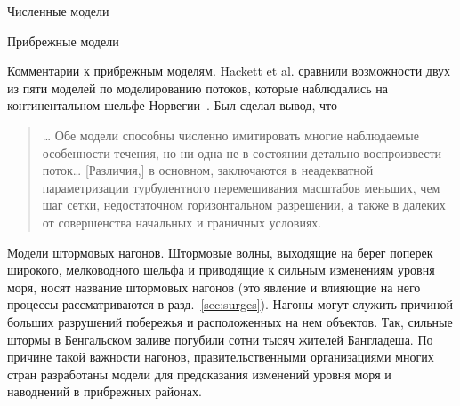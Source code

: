\begin{chapter}{Численные модели}
\begin{section}{Прибрежные модели}
\begin{paragraph}{Комментарии к прибрежным моделям.}
Hackett et al. сравнили возможности двух из пяти моделей по моделированию
потоков, которые наблюдались на континентальном шельфе Норвегии~\cite{Hackett:1995}. 
Был сделал вывод, что
%
\begin{quote}
\dots{} Обе модели способны численно имитировать многие наблюдаемые особенности 
течения, но ни одна не в состоянии детально воспроизвести поток\dots{} 
[Различия,] в основном, заключаются в неадекватной параметризации 
турбулентного перемешивания
масштабов меньших, чем шаг сетки, недостаточном горизонтальном
разрешении, а также в далеких от совершенства начальных и граничных условиях.
%
\end{quote}
\end{paragraph}

\begin{paragraph}{Модели штормовых нагонов.}
%
Штормовые волны, выходящие на берег поперек широкого,
мелководного шельфа и приводящие к сильным изменениям уровня моря,
носят название штормовых нагонов (это явление и влияющие на него процессы
рассматриваются в разд.~\ref{sec:surges}). Нагоны могут служить причиной 
больших разрушений побережья и расположенных на нем объектов.
Так, сильные штормы в Бенгальском заливе погубили сотни тысяч
жителей Бангладеша. По причине такой важности нагонов, правительственными
организациями многих стран разработаны модели для предсказания
изменений уровня моря и наводнений в прибрежных районах.
%


\end{paragraph}
\end{section}
\end{chapter}
